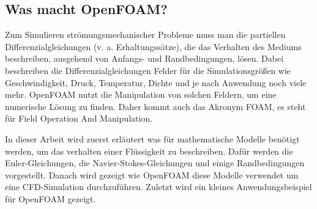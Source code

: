 \subsection{Was macht OpenFOAM?}
Zum Simulieren strömungsmechanischer Probleme muss man die partiellen Differenzialgleichungen (v. a. Erhaltungssätze), die das Verhalten des Mediums beschreiben, ausgehend von Anfangs- und Randbedingungen, lösen.
Dabei beschreiben die Differenzialgleichungen Felder für die Simulationsgrößen wie Geschwindigkeit, Druck, Temperatur, Dichte und je nach Anwendung noch viele mehr. OpenFOAM nutzt die Manipulation von solchen Feldern, um eine numerische Lösung zu finden. Daher kommt auch das Akronym FOAM, es steht für Field Operation And Manipulation.

In dieser Arbeit wird zuerst erläutert was für mathematische Modelle benötigt werden, um das verhalten einer Flüssigkeit zu beschreiben.
Dafür werden die Euler-Gleichungen, die Navier-Stokes-Gleichungen und einige Randbedingungen vorgestellt.
Danach wird gezeigt wie OpenFOAM diese Modelle verwendet um eine CFD-Simulation durchzuführen.
Zuletzt wird ein kleines Anwendungsbeispiel für OpenFOAM gezeigt.